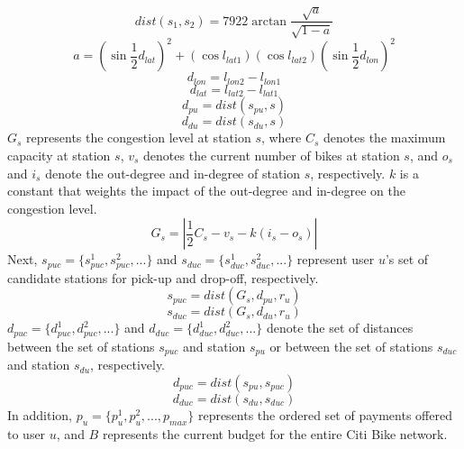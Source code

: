 \documentclass[times, 10pt,twocolumn]{article}
\begin{document}
\begin{equation}
dist(s_1,s_2) = 7922\arctan{\frac{\sqrt{a}}{\sqrt{1-a}}}
\end{equation}
\begin{equation}
a = (\sin{\frac{1}{2}d_{lat}})^2+(\cos{l_{lat1}})(\cos{l_{lat2}})(\sin{\frac{1}{2}d_{lon}})^2
\end{equation}
\begin{equation}
d_{lon} = l_{lon2} - l_{lon1}
\end{equation}
\begin{equation}
d_{lat} = l_{lat2} - l_{lat1}
\end{equation}
\begin{equation}
d_{pu} = dist(s_{pu}, s)
\end{equation}
\begin{equation}
d_{du} = dist(s_{du}, s)
\end{equation}
$G_s$ represents the congestion level at station $s$, where $C_s$ denotes the maximum capacity at station $s$, $v_s$ denotes the current number of bikes at station $s$, and $o_s$ and $i_s$ denote the out-degree and in-degree of station $s$, respectively. $k$ is a constant that weights the impact of the out-degree and in-degree on the congestion level.
\begin{equation}
G_s = |\frac{1}{2}C_s - v_s - k(i_s - o_s)|
\end{equation}
Next, $s_{puc} = \{s_{puc}^1, s_{puc}^2, ...\}$ and $s_{duc} = \{s_{duc}^1, s_{duc}^2, ...\}$ represent user $u$'s set of candidate stations for pick-up and drop-off, respectively.
\begin{equation}
s_{puc} = dist(G_s, d_{pu}, r_u)
\end{equation}
\begin{equation}
s_{duc} = dist(G_s, d_{du}, r_u)
\end{equation}
$d_{puc} = \{d_{puc}^1, d_{puc}^2, ...\}$ and $d_{duc} = \{d_{duc}^1, d_{duc}^2, ...\}$ denote the set of distances between the set of stations $s_{puc}$ and station $s_{pu}$ or between the set of stations $s_{duc}$ and station $s_{du}$, respectively.
\begin{equation}
d_{puc} = dist(s_{pu}, s_{puc})
\end{equation}
\begin{equation}
d_{duc} = dist(s_{du}, s_{duc})
\end{equation}
In addition, $p_u = \{p_u^1, p_u^2, ..., p_{max}\}$ represents the ordered set of payments offered to user $u$, and $B$ represents the current budget for the entire Citi Bike network.
\end{document}
